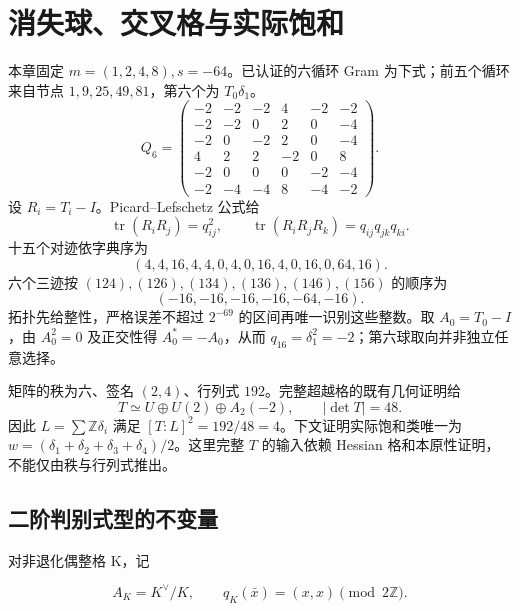 \documentclass[11pt,a4paper,oneside]{ctexrep}
\theoremstyle{cnplain}
\theoremstyle{definition}
\theoremstyle{remark}
\newcommand{\Z}{\mathbb Z}
\begin{document}
\chapter{消失球、交叉格与实际饱和}\label{ch:lattice}
本章固定 $m=(1,2,4,8),s=-64$。已认证的六循环 Gram 为下式；前五个循环来自节点 $1,9,25,49,81$，第六个为 $T_0\delta_1$。
\begin{equation}Q_6=\begin{pmatrix}
-2&-2&-2&4&-2&-2\\-2&-2&0&2&0&-4\\-2&0&-2&2&0&-4\\
4&2&2&-2&0&8\\-2&0&0&0&-2&-4\\-2&-4&-4&8&-4&-2
\end{pmatrix}.\label{eq:gram}\end{equation}
设 $R_i=T_i-I$。Picard--Lefschetz 公式给
\begin{equation}\operatorname{tr}(R_iR_j)=q_{ij}^2,\qquad
\operatorname{tr}(R_iR_jR_k)=q_{ij}q_{jk}q_{ki}.\end{equation}
十五个对迹依字典序为
\begin{equation}(4,4,16,4,4,0,4,0,16,4,0,16,0,64,16).\end{equation}
六个三迹按 $(124),(126),(134),(136),(146),(156)$ 的顺序为
\begin{equation}(-16,-16,-16,-16,-64,-16).\end{equation}
拓扑先给整性，严格误差不超过 $2^{-69}$ 的区间再唯一识别这些整数。取 $A_0=T_0-I$，由 $A_0^2=0$ 及正交性得 $A_0^*=-A_0$，从而 $q_{16}=\delta_1^2=-2$；第六球取向并非独立任意选择。

矩阵的秩为六、签名 $(2,4)$、行列式 $192$。完整超越格的既有几何证明给
\begin{equation}T\simeq U\oplus U(2)\oplus A_2(-2),\qquad |\det T|=48.\end{equation}
因此 $L=\sum\Z\delta_i$ 满足 $[T:L]^2=192/48=4$。下文证明实际饱和类唯一为 $w=(\delta_1+\delta_2+\delta_3+\delta_4)/2$。这里完整 $T$ 的输入依赖 Hessian 格和本原性证明，不能仅由秩与行列式推出\cite{dvgeemen}。

\section{二阶判别式型的不变量}\label{sec:lattice:2}

对非退化偶整格 K，记

\begin{equation}
A_K=K^\vee/K,\qquad
 q_K(\bar x)=(x,x)\pmod{2\mathbb Z}.
\end{equation}
\end{document}
